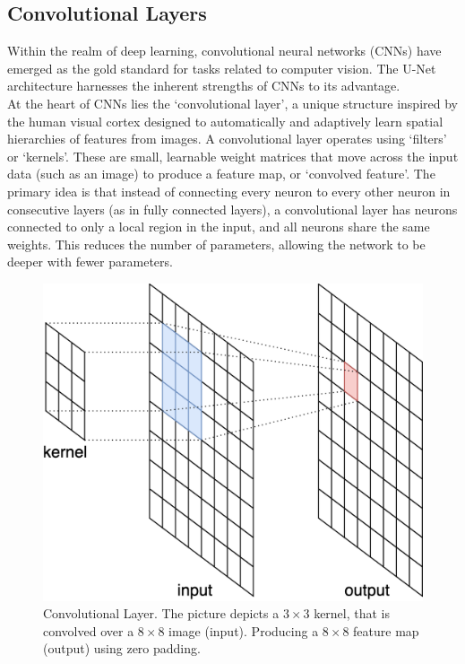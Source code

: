 \subsection{Convolutional Layers}
Within the realm of deep learning, convolutional neural networks (CNNs) have emerged as the gold standard for tasks related to computer vision.
The U-Net architecture harnesses the inherent strengths of CNNs to its advantage.\\[1ex]
\noindent At the heart of CNNs lies the `convolutional layer', a unique structure inspired by the human visual cortex designed to automatically and adaptively learn spatial hierarchies of features from images.
A convolutional layer operates using `filters' or `kernels'. These are small, learnable weight matrices that move across the input data (such as an image) to produce a feature map, or `convolved feature'.
The primary idea is that instead of connecting every neuron to every other neuron in consecutive layers (as in fully connected layers),
a convolutional layer has neurons connected to only a local region in the input, and all neurons share the same weights. This reduces the number of parameters,
allowing the network to be deeper with fewer parameters\cite[5-7]{oshea_introduction_2015}.

\begin{figure}[!hb]
	\centering
	\includegraphics[width=0.4\linewidth]{images/Convolution}
	\caption{Convolutional Layer. The picture depicts a $3\times3$ kernel, that is convolved over a $8\times8$ image (input). Producing a $8\times8$ feature map (output) using zero padding.}
	\label{fig:Conv}
\end{figure}

